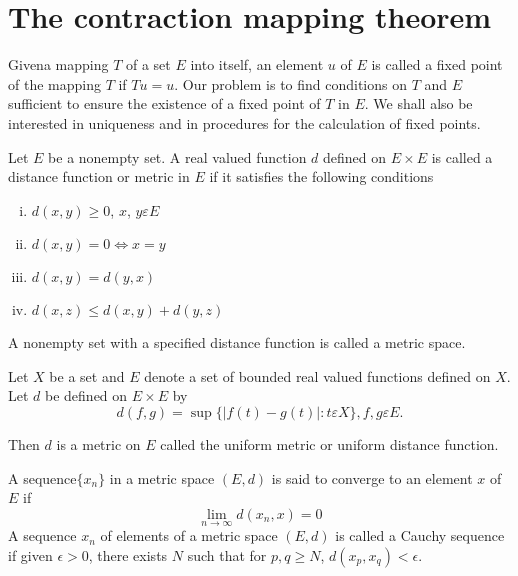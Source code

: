 \chapter{The contraction mapping theorem}\label{chap1}

 Given\pageoriginale a mapping $T$ of a set $E$ into itself, an
 element $u$ of $E$ 
 is called a fixed point of the mapping $T$ if $Tu= u$. Our problem is
 to find conditions on $T$ and $E$ sufficient to ensure the existence
 of a fixed point of $T$ in $E$. We shall also be interested in
 uniqueness and in procedures for the calculation of fixed points. 
 
 \begin{Definition}%
  Let $E$ be a nonempty set. A real valued function $d$ defined on $E
  \times E$ is called a distance function or metric in $E$ if it
  satisfies the following conditions 
 \begin{enumerate}[i)]
 \item $d(x,y)\geq 0$, $x$, $y \varepsilon E$

 \item $d(x,y ) = 0 \Longleftrightarrow x=y$

 \item $d(x,y) = d(y,x)$

 \item $d(x,z) \leq d(x,y)+ d(y,z)$
 \end{enumerate} 
 A nonempty set with a specified distance function is called a metric
 space.
 \end{Definition}

\begin{example*}%
 Let $X$ be a set and $E$ denote a set of bounded real valued
 functions defined on $X$. Let $d$ be defined on $E \times E$ by  
 $$
 d (f,g) = \sup \bigg\{ |f(t) - g(t)| : t \varepsilon X \bigg \}, f,g \varepsilon E.
 $$
 \end{example*}
 
 Then $d$ is a metric on $E$ called the uniform metric or uniform
 distance function. 
 
 \begin{Definition}%
 A sequence\pageoriginale $\{x_n \}$ in a metric space $(E,d)$ is said
 to converge 
 to an element $x$ of $E$ if  
 $$
 \lim_{n \to \infty} d (x_n, x) =0
 $$
 A sequence $x_n$ of elements of a metric space $(E,d)$ is called a
 Cauchy sequence if given $\epsilon > 0$, there exists $N$ such that for
 $p,q \geq N$, $d(x_p , x_q)< \epsilon$. 
 \end{Definition} 
 
